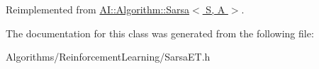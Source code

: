 Reimplemented from \hyperlink{classAI_1_1Algorithm_1_1Sarsa_ae1d62478d3e31cace3fb594e05f83d1c}{A\-I\-::\-Algorithm\-::\-Sarsa$<$ S, A $>$}.



The documentation for this class was generated from the following file\-:\begin{DoxyCompactItemize}
\item 
Algorithms/\-Reinforcement\-Learning/Sarsa\-E\-T.\-h\end{DoxyCompactItemize}
